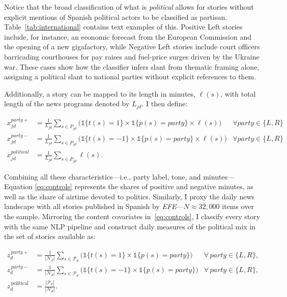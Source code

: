 \documentclass[12pt]{article}
\begin{document}
	Notice that the broad classification of what is \emph{political} allows for stories without explicit mentions of Spanish political actors to be classified as partisan. Table~\ref{tab:international} contains text examples of this.  Positive Left stories include, for instance,  an economic forecast from the European Commission and the opening of a new gigafactory, while Negative Left stories include court officers barricading courthouses for pay raises and fuel-price surges driven by the Ukraine war. These cases show how the classifier infers slant from thematic framing alone, assigning a political slant to national parties without explicit references to them. 
	
	
	Additionally, a story can be mapped to its length in minutes, \( \ell(s)\), with total length of the news programs  denoted by $L_{jd}$. I then define: 
	
	
	
	
	
	\begin{equation}\label{eq:controls}
		\begin{aligned}
			x_{jd}^{party+}&= \frac{1}{L_{jd}} \sum_{s \in P_{jd}}\bigg(\mathds{1}\{t(s)=1\} \times \mathds{1}\{p(s)=party\}\times \ell(s) \bigg) &\forall party \in \{L,R\} \\
			x_{jd}^{party-}&= \frac{1}{L_{jd}} \sum_{s \in P_{jd}}\bigg( \mathds{1}\{t(s)=-1\} \times \mathds{1}\{p(s)=party\} \times \ell(s)\bigg) &\forall party \in \{L,R\} \\
			x_{jd}^{political}&=\frac{1}{L_{jd}} \sum_{s \in P_{jd}}\ell(s).
		\end{aligned}
	\end{equation} 
	
	
	Combining all these characteristics—i.e., party label, tone, and minutes— Equation \eqref{eq:controls} represents the  shares of positive and negative minutes, as well as the share of airtime devoted to politics.	Similarly, I proxy the daily news landscape with all stories published in Spanish by \emph{ EFE}—$N\approx32{,}000$ items over the sample. Mirroring the content covariates in~\eqref{eq:controls}, I classify every  story with the same NLP pipeline and construct daily measures of the political mix in the set of stories available as:
	
	\begin{equation}\label{eq:efe}
		\begin{aligned}
			z_d^{\,party+} &= \frac{1}{|\mathcal{N}_d|}\sum_{s\in \mathcal{P}_d}
			\bigg(\mathds{1}\{t(s)=1\}\times \mathds{1}\{p(s)=\textit{party}\}\bigg)
			&\forall\,\textit{party}\in\{L,R\},\\
			z_d^{\,party-} &= \frac{1}{|\mathcal{N}_d|}\sum_{s\in \mathcal{P}_d}
			\bigg(\mathds{1}\{t(s)=-1\}\times \mathds{1}\{p(s)=\textit{party}\}\bigg)
			&\forall\,\textit{party}\in\{L,R\},\\
			z_d^{\,\text{political}} &= \frac{|\mathcal{P}_d|}{|\mathcal{N}_d|}.
		\end{aligned}
	\end{equation}
	
\end{document}
